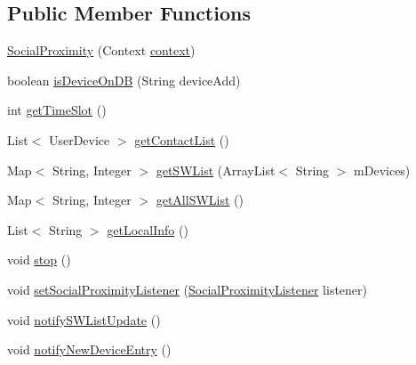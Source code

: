 \subsection*{Public Member Functions}
\begin{DoxyCompactItemize}
\item 
\hyperlink{classcom_1_1copelabs_1_1oiframework_1_1socialproximity_1_1_social_proximity_aa0abea52e79d4068926435fb82b37735}{Social\+Proximity} (Context \hyperlink{classcom_1_1copelabs_1_1oiframework_1_1socialproximity_1_1_social_proximity_ada103a1960c6dea378ae77ffefe7d8ea}{context})
\item 
boolean \hyperlink{classcom_1_1copelabs_1_1oiframework_1_1socialproximity_1_1_social_proximity_adcaf0f6c301cbdea12062fc4c59c0e23}{is\+Device\+On\+D\+B} (String device\+Add)
\item 
int \hyperlink{classcom_1_1copelabs_1_1oiframework_1_1socialproximity_1_1_social_proximity_a7a846e4b25fc5b155460bcc6359687ff}{get\+Time\+Slot} ()
\item 
List$<$ User\+Device $>$ \hyperlink{classcom_1_1copelabs_1_1oiframework_1_1socialproximity_1_1_social_proximity_a7149c4924d736e3bc6ddf137273a2977}{get\+Contact\+List} ()
\item 
Map$<$ String, Integer $>$ \hyperlink{classcom_1_1copelabs_1_1oiframework_1_1socialproximity_1_1_social_proximity_a186495492336f4310184b9181e2cd432}{get\+S\+W\+List} (Array\+List$<$ String $>$ m\+Devices)
\item 
Map$<$ String, Integer $>$ \hyperlink{classcom_1_1copelabs_1_1oiframework_1_1socialproximity_1_1_social_proximity_a64d4c41b2da621cec32eb21ad6df3090}{get\+All\+S\+W\+List} ()
\item 
List$<$ String $>$ \hyperlink{classcom_1_1copelabs_1_1oiframework_1_1socialproximity_1_1_social_proximity_a44da1f5cf4b7a6eb0fe7988382b9019f}{get\+Local\+Info} ()
\item 
void \hyperlink{classcom_1_1copelabs_1_1oiframework_1_1socialproximity_1_1_social_proximity_a7577e7c8e2ac336f26a2ee4229f1f797}{stop} ()
\item 
void \hyperlink{classcom_1_1copelabs_1_1oiframework_1_1socialproximity_1_1_social_proximity_afa485e2acf77e6975c20739cf46a6511}{set\+Social\+Proximity\+Listener} (\hyperlink{interfacecom_1_1copelabs_1_1oiframework_1_1socialproximity_1_1_social_proximity_listener}{Social\+Proximity\+Listener} listener)
\item 
void \hyperlink{classcom_1_1copelabs_1_1oiframework_1_1socialproximity_1_1_social_proximity_ae01083ff8b552f137319ab25f42c5023}{notify\+S\+W\+List\+Update} ()
\item 
void \hyperlink{classcom_1_1copelabs_1_1oiframework_1_1socialproximity_1_1_social_proximity_af79f5f5ed8193826c133105870c2cbcd}{notify\+New\+Device\+Entry} ()
\end{DoxyCompactItemize}
